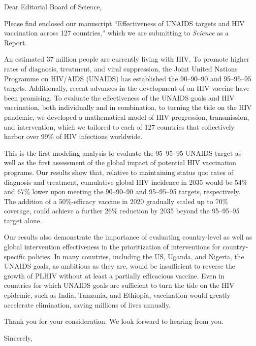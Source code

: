 \documentclass{jpmletter}
\begin{document}
  \begin{letter}{}

    \opening{Dear Editorial Board of Science,}
 
    Please find enclosed our manuscript ``Effectiveness of UNAIDS
    targets and HIV vaccination across 127 countries,'' which we are
    submitting to \textit{Science} as a Report.
 
    An estimated 37 million people are currently living with HIV. To
    promote higher rates of diagnosis, treatment, and viral
    suppression, the Joint United Nations Programme on HIV/AIDS
    (UNAIDS) has established the 90–90–90 and 95–95–95
    targets. Additionally, recent advances in the development of an
    HIV vaccine have been promising. To evaluate the effectiveness of
    the UNAIDS goals and HIV vaccination, both individually and in
    combination, to turning the tide on the HIV pandemic, we developed
    a mathematical model of HIV progression, transmission, and
    intervention, which we tailored to each of 127 countries that
    collectively harbor over 99\% of HIV infections worldwide.

    This is the first modeling analysis to evaluate the 95–95–95
    UNAIDS target as well as the first assessment of the global impact
    of potential HIV vaccination programs. Our results show that,
    relative to maintaining status quo rates of diagnosis and
    treatment, cumulative global HIV incidence in 2035 would be 54\%
    and 67\% lower upon meeting the 90–90–90 and 95–95–95 targets,
    respectively. The addition of a 50\%-efficacy vaccine in 2020
    gradually scaled up to 70\% coverage, could achieve a further 26\%
    reduction by 2035 beyond the 95–95–95 target alone.

    Our results also demonstrate the importance of evaluating
    country-level as well as global intervention effectiveness in the
    prioritization of interventions for country-specific policies. In
    many countries, including the US, Uganda, and Nigeria, the UNAIDS
    goals, as ambitious as they are, would be insufficient to reverse
    the growth of PLHIV without at least a partially efficacious
    vaccine. Even in countries for which UNAIDS goals are sufficient
    to turn the tide on the HIV epidemic, such as India, Tanzania, and
    Ethiopia, vaccination would greatly accelerate elimination, saving
    millions of lives annually.
 
    Thank you for your consideration. We look forward to hearing from
    you.

    \closing{Sincerely,}

  \end{letter}
\end{document}
